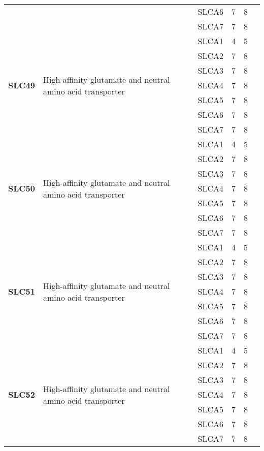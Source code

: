 \documentclass[12pt]{report}
\begin{document}
\begin{center}
\begin{longtable}{|p{1.5cm}|p{3.2cm}|p{1.9cm}|p{1.65cm}|p{3cm}|p{3cm}|}
\cline{3-6}
&&SLCA6&7 & 8&\\ 
\cline{3-6}
&&SLCA7&7 & 8&\\ 
\hline
\multirow{7}{1.5cm}{\textbf{SLC49}} & \multirow{7}{4cm}{High-affinity glutamate and neutral amino acid transporter} & SLCA1 & 4 & 5\\ 
\cline{3-6}
&&SLCA2&7 & 8&\\ 
\cline{3-6}
&&SLCA3&7 & 8&\\ 
\cline{3-6}
&&SLCA4&7 & 8&\\ 
\cline{3-6}
&&SLCA5&7 & 8&\\ 
\cline{3-6}
&&SLCA6&7 & 8&\\ 
\cline{3-6}
&&SLCA7&7 & 8&\\ 
\hline
\multirow{7}{1.5cm}{\textbf{SLC50}} & \multirow{7}{4cm}{High-affinity glutamate and neutral amino acid transporter} & SLCA1 & 4 & 5\\ 
\cline{3-6}
&&SLCA2&7 & 8&\\ 
\cline{3-6}
&&SLCA3&7 & 8&\\ 
\cline{3-6}
&&SLCA4&7 & 8&\\ 
\cline{3-6}
&&SLCA5&7 & 8&\\ 
\cline{3-6}
&&SLCA6&7 & 8&\\ 
\cline{3-6}
&&SLCA7&7 & 8&\\ 
\hline
\multirow{7}{1.5cm}{\textbf{SLC51}} & \multirow{7}{4cm}{High-affinity glutamate and neutral amino acid transporter} & SLCA1 & 4 & 5\\ 
\cline{3-6}
&&SLCA2&7 & 8&\\ 
\cline{3-6}
&&SLCA3&7 & 8&\\ 
\cline{3-6}
&&SLCA4&7 & 8&\\ 
\cline{3-6}
&&SLCA5&7 & 8&\\ 
\cline{3-6}
&&SLCA6&7 & 8&\\ 
\cline{3-6}
&&SLCA7&7 & 8&\\ 
\hline
\multirow{7}{1.5cm}{\textbf{SLC52}} & \multirow{7}{4cm}{High-affinity glutamate and neutral amino acid transporter} & SLCA1 & 4 & 5\\ 
\cline{3-6}
&&SLCA2&7 & 8&\\ 
\cline{3-6}
&&SLCA3&7 & 8&\\ 
\cline{3-6}
&&SLCA4&7 & 8&\\ 
\cline{3-6}
&&SLCA5&7 & 8&\\ 
\cline{3-6}
&&SLCA6&7 & 8&\\ 
\cline{3-6}
&&SLCA7&7 & 8&\\ 
\hline

\end{longtable}
\end{center}
\end{document}
